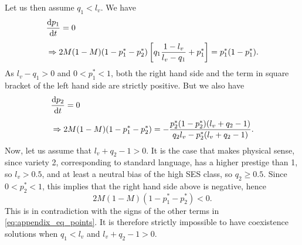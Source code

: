 \documentclass[../thesis.tex]{subfiles}
\begin{document}
Let us then assume $q_1 < l_v$. We have
\begin{equation}
    \label{eq:appendix_eq_points}
    \begin{aligned}
        & \dv{p_1}{t} = 0
        \\[1ex]
        & \Rightarrow 2 M (1 - M) (1 - p_1^* - p_2^*) \left[q_1 \frac{1 - l_v}{l_v - q_1} + p_1^* \right] = p_1^* (1 - p_1^*).
    \end{aligned}
\end{equation}
As $l_v - q_1 > 0$ and $0 < p_1^* < 1$, both the right hand side and the term in square
bracket of the left hand side are strictly positive. But we also have
\begin{equation}
    \begin{aligned}
        & \dv{p_2}{t} = 0
        \\[1ex]
        & \Rightarrow 2 M (1 - M) (1 - p_1^* - p_2^*)
            = - \frac{p_2^* (1 - p_2^*) (l_v + q_2 - 1)}{q_2 l_v - p_2^* (l_v + q_2 - 1)}.
    \end{aligned}
\end{equation}
Now, let us assume that $l_v + q_2 - 1 > 0$. It is the case that makes physical sense,
since variety 2, corresponding to standard language, has a higher prestige than 1, so
$l_v > 0.5$, and at least a neutral bias of the high \ac{SES} class, so $q_2 \geq 0.5$.
Since $0 < p_2^* < 1$, this implies that the right hand side above is negative, hence 
\begin{equation}
    2 M (1 - M) (1 - p_1^* - p_2^*) < 0.
\end{equation}
This is in contradiction with the signs of the other terms in
\cref{eq:appendix_eq_points}. It is therefore strictly impossible to have coexistence
solutions when $q_1 < l_v$ and $l_v + q_2 - 1 > 0$.
\end{document}

